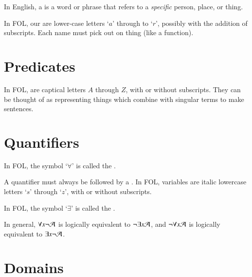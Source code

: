 \documentclass[12pt, a4paper, twoside, openright, titlepage]{book}
\begin{document}
\begin{defn}{}{}
    In English, a  is a word or phrase that refers to a \emph{specific} person, place, or thing.
\end{defn}

\begin{defn}{}{}
    In FOL, our  are lower-case letters `$a$' through to `$r$', possibly with the addition of subscripts. Each name must pick out  on thing (like a function).
\end{defn}

\section{\textsection Predicates}

\begin{defn}{}{}
    In FOL,  are captical letters $A$ through $Z$, with or without subscripts. They can be thought of as representing things which combine with singular terms to make sentences.
\end{defn}


\section{\textsection Quantifiers}

\begin{defn}{}{}
    In FOL, the symbol `$\forall$' is called the .
\end{defn}

\begin{rmk}{}{}
    A quantifier must always be followed by a . In FOL, variables are italic lowercase letters `$s$' through `$z$', with or without subscripts.
\end{rmk}


\begin{defn}{}{}
    In FOL, the symbol `$\exists$' is called the .
\end{defn}

\begin{rmk}{}{}
    In general, $\forall x\neg \mathcal{A}$ is logically equivalent to $\neg \exists x\mathcal{A}$, and $\neg\forall x \mathcal{A}$ is logically equivalent to $\exists x \neg \mathcal{A}$.
\end{rmk}


\section{\textsection Domains}
\end{document}
